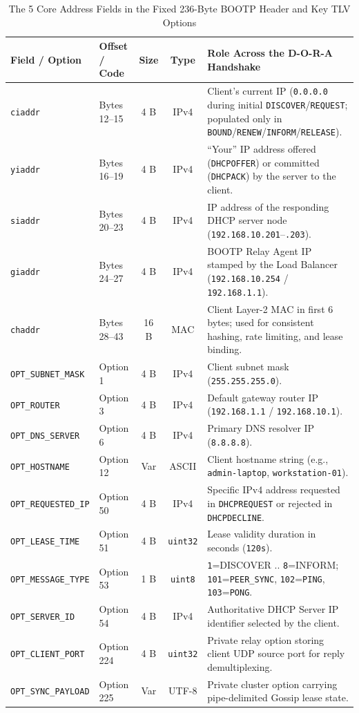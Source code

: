 \documentclass[11pt,a4paper]{article}
\begin{document}
\begin{table}[H]
\centering
\caption{The 5 Core Address Fields in the Fixed 236-Byte BOOTP Header and Key TLV Options}
\label{tab:dhcp_addresses}
\small
\begin{tabularx}{\textwidth}{@{}llccY@{}}
\toprule
\textbf{Field / Option} & \textbf{Offset / Code} & \textbf{Size} & \textbf{Type} & \textbf{Role Across the D-O-R-A Handshake} \\ \midrule
\texttt{ciaddr} & Bytes 12--15 & 4 B & IPv4 & Client's current IP (\texttt{0.0.0.0} during initial \texttt{DISCOVER}/\texttt{REQUEST}; populated only in \texttt{BOUND}/\texttt{RENEW}/\texttt{INFORM}/\texttt{RELEASE}). \\
\texttt{yiaddr} & Bytes 16--19 & 4 B & IPv4 & ``Your'' IP address offered (\texttt{DHCPOFFER}) or committed (\texttt{DHCPACK}) by the server to the client. \\
\texttt{siaddr} & Bytes 20--23 & 4 B & IPv4 & IP address of the responding DHCP server node (\texttt{192.168.10.201}--\texttt{.203}). \\
\texttt{giaddr} & Bytes 24--27 & 4 B & IPv4 & BOOTP Relay Agent IP stamped by the Load Balancer (\texttt{192.168.10.254} / \texttt{192.168.1.1}). \\
\texttt{chaddr} & Bytes 28--43 & 16 B & MAC & Client Layer-2 MAC in first 6 bytes; used for consistent hashing, rate limiting, and lease binding. \\ \midrule
\texttt{OPT\_SUBNET\_MASK} & Option 1 & 4 B & IPv4 & Client subnet mask (\texttt{255.255.255.0}). \\
\texttt{OPT\_ROUTER} & Option 3 & 4 B & IPv4 & Default gateway router IP (\texttt{192.168.1.1} / \texttt{192.168.10.1}). \\
\texttt{OPT\_DNS\_SERVER} & Option 6 & 4 B & IPv4 & Primary DNS resolver IP (\texttt{8.8.8.8}). \\
\texttt{OPT\_HOSTNAME} & Option 12 & Var & ASCII & Client hostname string (e.g., \texttt{admin-laptop}, \texttt{workstation-01}). \\
\texttt{OPT\_REQUESTED\_IP} & Option 50 & 4 B & IPv4 & Specific IPv4 address requested in \texttt{DHCPREQUEST} or rejected in \texttt{DHCPDECLINE}. \\
\texttt{OPT\_LEASE\_TIME} & Option 51 & 4 B & \texttt{uint32} & Lease validity duration in seconds (\texttt{120s}). \\
\texttt{OPT\_MESSAGE\_TYPE} & Option 53 & 1 B & \texttt{uint8} & \texttt{1}=DISCOVER .. \texttt{8}=INFORM; \texttt{101}=\texttt{PEER\_SYNC}, \texttt{102}=\texttt{PING}, \texttt{103}=\texttt{PONG}. \\
\texttt{OPT\_SERVER\_ID} & Option 54 & 4 B & IPv4 & Authoritative DHCP Server IP identifier selected by the client. \\
\texttt{OPT\_CLIENT\_PORT} & Option 224 & 4 B & \texttt{uint32} & Private relay option storing client UDP source port for reply demultiplexing. \\
\texttt{OPT\_SYNC\_PAYLOAD} & Option 225 & Var & UTF-8 & Private cluster option carrying pipe-delimited Gossip lease state. \\ \bottomrule
\end{tabularx}
\end{table}
\end{document}
